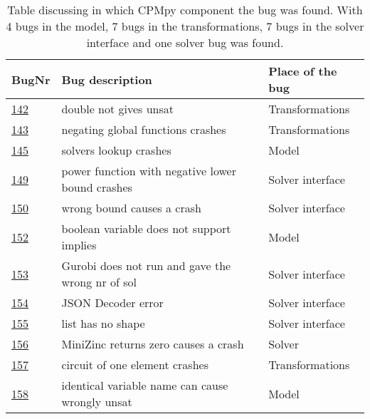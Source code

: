 \begin{table}[]
	\centering
	\caption{Table discussing in which CPMpy component the bug was found. With 4 bugs in the model, 7 bugs in the transformations, 7 bugs in the solver interface and one solver bug was found.}
	\label{tab:bug:placeComponent}
	\begin{tabular}{lll}
		\hline
		BugNr & Bug description                                         & Place of the bug \\ \toprule
		\href{https://github.com/CPMpy/cpmpy/issues/142}{142} & double not gives unsat                            & Transformations \\
		\href{https://github.com/CPMpy/cpmpy/issues/143}{143} & negating global functions crashes                 & Transformations \\
		\href{https://github.com/CPMpy/cpmpy/issues/145}{145} & solvers lookup crashes                            & Model            \\
		\href{https://github.com/CPMpy/cpmpy/issues/149}{149} & power function with negative lower bound crashes  & Solver interface \\
		\href{https://github.com/CPMpy/cpmpy/issues/150}{150} & wrong bound causes a crash                        & Solver interface \\
		\href{https://github.com/CPMpy/cpmpy/issues/152}{152} & boolean variable does not support implies         & Model            \\
		\href{https://github.com/CPMpy/cpmpy/issues/153}{153} & Gurobi does not run and gave the wrong nr of sol  & Solver interface \\
		\href{https://github.com/CPMpy/cpmpy/issues/154}{154} & JSON Decoder error                                & Solver interface \\
		\href{https://github.com/CPMpy/cpmpy/issues/155}{155} & list has no shape                                 & Solver interface \\
		\href{https://github.com/CPMpy/cpmpy/issues/156}{156} & MiniZinc returns zero causes a crash              & Solver           \\
		\href{https://github.com/CPMpy/cpmpy/issues/157}{157} & circuit of one element crashes                    & Transformations  \\
		\href{https://github.com/CPMpy/cpmpy/issues/158}{158} & identical variable name can cause wrongly unsat   & Model            \\

\end{tabular}
\end{table}
